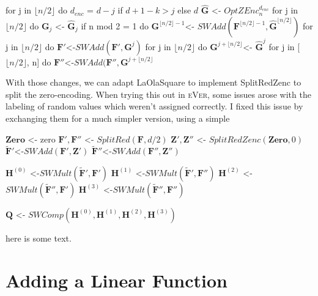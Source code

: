 \documentclass[english, version-2020-11]{uzl-thesis}
\newcommand{\toolname}[1]{\textsc{#1}}
\begin{document}
\begin{Pseudocode}[caption={SplitRedZenc for Zero-Encoding, $n=d+1$ and $k\leq \lfloor \frac{d}{2} \rfloor$}, label=alg:splitredzenc ]
    for j in $\lfloor n/2 \rfloor$ do
    $d_{enc}$ = $d-j$ if $d+1-k>j$ else $d$
    $\hat{\mathbf{G}}$ <- $OptZEnc^{d_{enc}}_n$
  for j in $\lfloor n/2 \rfloor$ do
    $\mathbf{G}_j$ <- $\hat{\mathbf{G}}_j$
  if n mod 2 = 1 do
    $\mathbf{G}^{\lfloor n/2 \rfloor-1}$<- $SWAdd(\mathbf{F}^{\lfloor n/2 \rfloor-1}, \hat{\mathbf{G}}^{\lfloor n/2 \rfloor})$
  for j in $\lfloor n/2 \rfloor$ do
    $\mathbf{F}'$<-$SWAdd(\mathbf{F}',\mathbf{G}^j)$
  for j in $\lfloor n/2 \rfloor$ do
    $\mathbf{G}^{j+\lfloor n/2 \rfloor}$<- $\hat{\mathbf{G}}^j$
  for j in [$\lfloor n/2 \rfloor$, n] do
    $\mathbf{F}''$<-$SWAdd(\mathbf{F}'', \mathbf{G}^{j+\lfloor n/2 \rfloor}$
  \end{Pseudocode}

  With those changes, we can adapt LaOlaSquare to implement SplitRedZenc to split the zero-encoding. When trying this out in \toolname{eVer}, some issues arose with the labeling of random values which weren't assigned correctly. I fixed this issue by exchanging them for a much simpler version, using a simple 

\begin{Pseudocode}[caption={LaOlaSquare}, label={alg:laolasquare2}]
    $\mathbf{Zero}$ <- zero 
    $\mathbf{F'},\mathbf{F''}$ <- $SplitRed(\mathbf{F}, d/2)$
    $\mathbf{Z'},\mathbf{Z''}$ <- $SplitRedZenc(\mathbf{Zero}, 0)$
    $\tilde{\mathbf{F}}' $<-$ SWAdd(\mathbf{F}',\mathbf{Z}')$
    $\tilde{\mathbf{F}}'' $<-$ SWAdd(\mathbf{F}'', \mathbf{Z}'')$
    
    $\mathbf{H}^{(0)}$ <-$SWMult(\tilde{\mathbf{F}}',\mathbf{F}')$
    $\mathbf{H}^{(1)}$ <-$SWMult(\tilde{\mathbf{F}}',\mathbf{F}'')$
    $\mathbf{H}^{(2)}$ <-$SWMult(\tilde{\mathbf{F}}'',\mathbf{F}')$
    $\mathbf{H}^{(3)}$ <-$SWMult(\tilde{\mathbf{F}}'',\mathbf{F}'')$

    $\mathbf{Q}$ <- $SWComp(\mathbf{H}^{(0)},\mathbf{H}^{(1)},\mathbf{H}^{(2)},\mathbf{H}^{(3)}) $
\end{Pseudocode}
here is some text.
\section{Adding a Linear Function}
\end{document}
